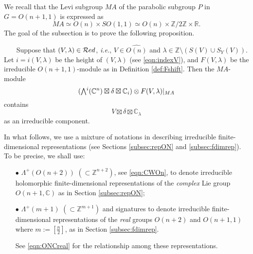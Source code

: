 We recall that the Levi subgroup $M A$
 of the parabolic subgroup $P$
 in $G=O(n+1,1)$ is expressed as
\[
   M A \simeq  O(n) \times S O(1,1)
       \simeq O(n) \times {\mathbb{Z}} / 2 {\mathbb{Z}} \times {\mathbb{R}}.
\]  
The goal of the subsection is to prove
 the following proposition.  
\begin{proposition}
\label{prop:180863}
~~~\newline
Suppose that $(V,\lambda) \in {\mathcal{R}}ed$, 
 {\it{i.e.}}, 
 $V \in \widehat{O(n)}$
 and $\lambda \in {\mathbb{Z}} \setminus (S(V) \cup S_Y(V))$.  
Let $i=i(V,\lambda)$ be the height of $(V,\lambda)$
 (see \eqref{eqn:indexV}), 
 and $F(V, \lambda)$ be the irreducible $O(n+1,1)$-module
 as in Definition \ref{def:Fshift}.  
Then the $M A$-module
\begin{equation}
\label{eqn:itensorF}
  (\Exterior^i({\mathbb{C}}^n) \boxtimes \delta \boxtimes {\mathbb{C}}_i)
  \otimes
  F(V, \lambda)|_{M A}
\end{equation}
contains
\[
V \boxtimes \delta \boxtimes {\mathbb{C}}_{\lambda}
\]
 as an irreducible component.  
\end{proposition}
In what follows, 
 we use a mixture of notations
 in describing irreducible finite-dimensional representations
 (see Sections \ref{subsec:repON} and \ref{subsec:fdimrep}).  
To be precise, 
 we shall use:
\begin{enumerate}
\item[$\bullet$]
$\Lambda^+(O(n+2))$ $(\subset {\mathbb{Z}}^{n+2})$, 
 see \eqref{eqn:CWOn}, 
 to denote irreducible holomorphic finite-dimensional representations
 of the {\it{complex}} Lie group $O(n+1,{\mathbb{C}})$
 as in Section \ref{subsec:repON};
\item[$\bullet$]
$\Lambda^+(m+1)$ $(\subset {\mathbb{Z}}^{m+1})$
 and signatures to denote irreducible
 finite-dimensional representations
 of the {\it{real}} groups $O(n+2)$ and $O(n+1,1)$
 where $m:=[\frac n 2]$, 
 as in Section \ref{subsec:fdimrep}.  



See \eqref{eqn:ONCreal} 
 for the relationship 
 among these representations.  
\end{enumerate}

